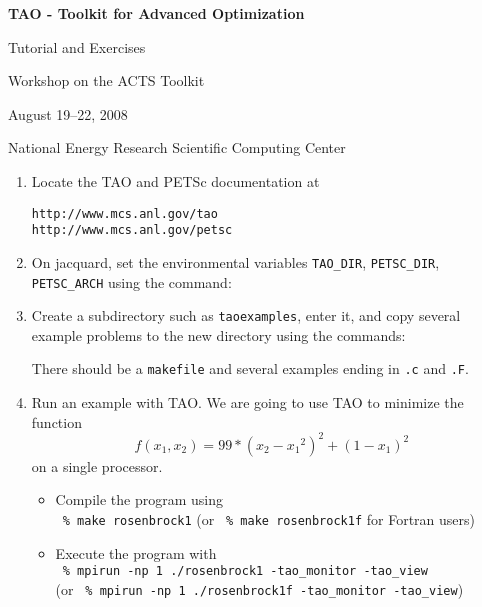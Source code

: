 \documentclass[11pt]{article}
\begin{document}
\begin{center}
{\bf
TAO - Toolkit for Advanced Optimization
        
Tutorial and Exercises

\vspace{0.25in}

Workshop on the ACTS Toolkit

August 19--22, 2008

National Energy Research Scientific Computing Center
}
\end{center}
\vspace{0.25in}

\begin{enumerate}

\item Locate the TAO and PETSc documentation at 
\begin{alltt}
http://www.mcs.anl.gov/tao
http://www.mcs.anl.gov/petsc
\end{alltt}

\item On jacquard, set the environmental variables
\texttt{TAO\_DIR}, \texttt{PETSC\_DIR}, \texttt{PETSC\_ARCH} 
using the command:
\begin{alltt}
% module load tao/1.9_g_c++
\end{alltt}

\item Create a subdirectory such as \texttt{taoexamples}, enter it, and copy several example problems to the new directory using the commands:
\begin{alltt}
% mkdir taoexamples
% cd taoexamples
% cp -R \$TAO_DIR/src/unconstrained/examples/tutorials/* .
% ls
\end{alltt}
There should be a \texttt{makefile} and several examples ending in \texttt{.c} and \texttt{.F}.

\item Run an example with TAO.
We are going to use TAO to minimize the function 
\[
    f(x_1,x_2) = 99*(x_2-{x_1}^2)^2 + (1-x_1)^2 
\]
on a single processor.
\begin{itemize}

 \item Compile the program using \\
  \quad \texttt{ \% make rosenbrock1} 
  (or \texttt{ \% make rosenbrock1f} for Fortran users)

 \item Execute the program with \\
  \quad \texttt{ \% mpirun -np 1 ./rosenbrock1 -tao\_monitor -tao\_view} \\
  (or \texttt{ \% mpirun -np 1 ./rosenbrock1f -tao\_monitor -tao\_view}) \\


\end{itemize}
\end{enumerate}
\end{document}
